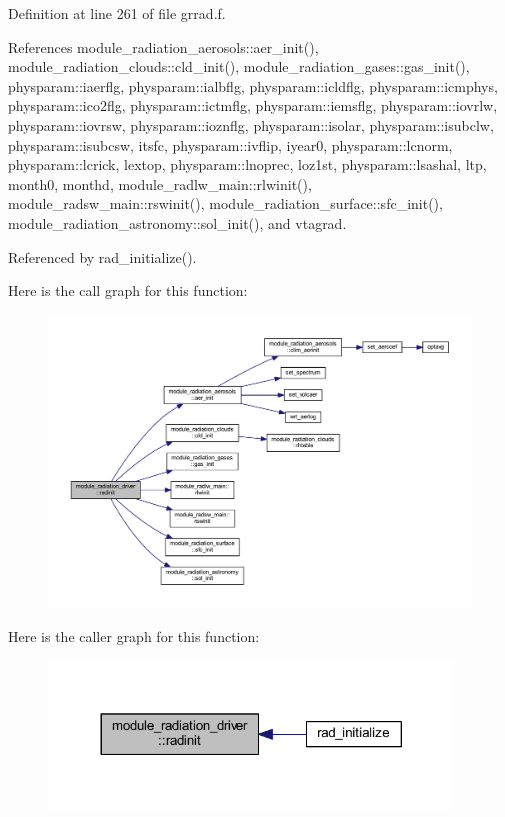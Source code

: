 Definition at line 261 of file grrad.\+f.



References module\+\_\+radiation\+\_\+aerosols\+::aer\+\_\+init(), module\+\_\+radiation\+\_\+clouds\+::cld\+\_\+init(), module\+\_\+radiation\+\_\+gases\+::gas\+\_\+init(), physparam\+::iaerflg, physparam\+::ialbflg, physparam\+::icldflg, physparam\+::icmphys, physparam\+::ico2flg, physparam\+::ictmflg, physparam\+::iemsflg, physparam\+::iovrlw, physparam\+::iovrsw, physparam\+::ioznflg, physparam\+::isolar, physparam\+::isubclw, physparam\+::isubcsw, itsfc, physparam\+::ivflip, iyear0, physparam\+::lcnorm, physparam\+::lcrick, lextop, physparam\+::lnoprec, loz1st, physparam\+::lsashal, ltp, month0, monthd, module\+\_\+radlw\+\_\+main\+::rlwinit(), module\+\_\+radsw\+\_\+main\+::rswinit(), module\+\_\+radiation\+\_\+surface\+::sfc\+\_\+init(), module\+\_\+radiation\+\_\+astronomy\+::sol\+\_\+init(), and vtagrad.



Referenced by rad\+\_\+initialize().



Here is the call graph for this function\+:\nopagebreak
\begin{figure}[H]
\begin{center}
\leavevmode
\includegraphics[width=350pt]{namespacemodule__radiation__driver_af039e0c23dc6ab8d2f8b1c1c796ac0da_cgraph}
\end{center}
\end{figure}




Here is the caller graph for this function\+:\nopagebreak
\begin{figure}[H]
\begin{center}
\leavevmode
\includegraphics[width=305pt]{namespacemodule__radiation__driver_af039e0c23dc6ab8d2f8b1c1c796ac0da_icgraph}
\end{center}
\end{figure}


